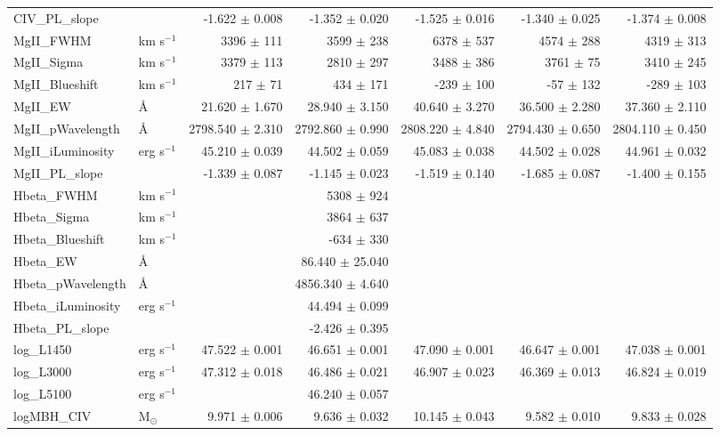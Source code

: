 \documentclass[fleqn,usenatbib]{mnras}
\begin{document}
\begin{table*}
\begin{tabular}{llrrrrr}
CIV\_PL\_slope &  & -1.622 $\pm$ 0.008 & -1.352 $\pm$ 0.020 & -1.525 $\pm$ 0.016 & -1.340 $\pm$ 0.025 & -1.374 $\pm$ 0.008 \\ 
MgII\_FWHM & km s$^{-1}$ & 3396 $\pm$ 111 & 3599 $\pm$ 238 & 6378 $\pm$ 537 & 4574 $\pm$ 288 & 4319 $\pm$ 313 \\ 
MgII\_Sigma & km s$^{-1}$ & 3379 $\pm$ 113 & 2810 $\pm$ 297 & 3488 $\pm$ 386 & 3761 $\pm$ 75 & 3410 $\pm$ 245 \\ 
MgII\_Blueshift & km s$^{-1}$ & 217 $\pm$ 71 & 434 $\pm$ 171 & -239 $\pm$ 100 & -57 $\pm$ 132 & -289 $\pm$ 103 \\ 
MgII\_EW & \AA & 21.620 $\pm$ 1.670 & 28.940 $\pm$ 3.150 & 40.640 $\pm$ 3.270 & 36.500 $\pm$ 2.280 & 37.360 $\pm$ 2.110 \\ 
MgII\_pWavelength & \AA & 2798.540 $\pm$ 2.310 & 2792.860 $\pm$ 0.990 & 2808.220 $\pm$ 4.840 & 2794.430 $\pm$ 0.650 & 2804.110 $\pm$ 0.450 \\ 
MgII\_iLuminosity & erg s$^{-1}$ & 45.210 $\pm$ 0.039 & 44.502 $\pm$ 0.059 & 45.083 $\pm$ 0.038 & 44.502 $\pm$ 0.028 & 44.961 $\pm$ 0.032 \\ 
MgII\_PL\_slope &  & -1.339 $\pm$ 0.087 & -1.145 $\pm$ 0.023 & -1.519 $\pm$ 0.140 & -1.685 $\pm$ 0.087 & -1.400 $\pm$ 0.155 \\ 
Hbeta\_FWHM & km s$^{-1}$ &  & 5308 $\pm$ 924 &  &  &  \\ 
Hbeta\_Sigma & km s$^{-1}$ &  & 3864 $\pm$ 637 &  &  &  \\ 
Hbeta\_Blueshift & km s$^{-1}$ &  & -634 $\pm$ 330 &  &  &  \\ 
Hbeta\_EW & \AA &  & 86.440 $\pm$ 25.040 &  &  &  \\ 
Hbeta\_pWavelength & \AA &  & 4856.340 $\pm$ 4.640 &  &  &  \\ 
Hbeta\_iLuminosity & erg s$^{-1}$ &  & 44.494 $\pm$ 0.099 &  &  &  \\ 
Hbeta\_PL\_slope &  &  & -2.426 $\pm$ 0.395 &  &  &  \\ 
log\_L1450 & erg s$^{-1}$ & 47.522 $\pm$ 0.001 & 46.651 $\pm$ 0.001 & 47.090 $\pm$ 0.001 & 46.647 $\pm$ 0.001 & 47.038 $\pm$ 0.001 \\ 
log\_L3000 & erg s$^{-1}$ & 47.312 $\pm$ 0.018 & 46.486 $\pm$ 0.021 & 46.907 $\pm$ 0.023 & 46.369 $\pm$ 0.013 & 46.824 $\pm$ 0.019 \\ 
log\_L5100 & erg s$^{-1}$ &  & 46.240 $\pm$ 0.057 &  &  &  \\ 
logMBH\_CIV & M$_{\odot}$ & 9.971 $\pm$ 0.006 & 9.636 $\pm$ 0.032 & 10.145 $\pm$ 0.043 & 9.582 $\pm$ 0.010 & 9.833 $\pm$ 0.028 \\ 

\end{tabular}
\end{table*}
\end{document}
